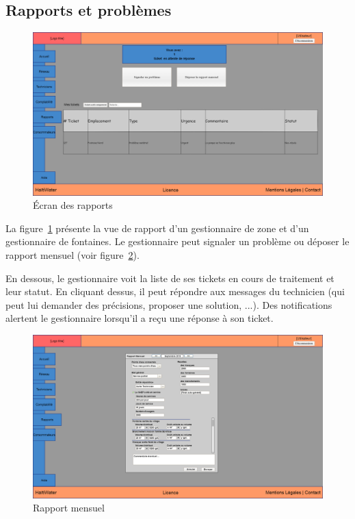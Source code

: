 \documentclass[a4paper, 11pt]{article}
\begin{document}
  \subsection{Rapports et problèmes}
    \begin{figure}[H]
        \includegraphics[width=\textwidth]{Cahier_des_Charges/rapports}
        \caption{\'Ecran des rapports}
        \label{fig:report}
    \end{figure}
    La figure~\ref{fig:report} présente la vue de rapport d'un gestionnaire de zone et d'un gestionnaire de fontaines. Le gestionnaire peut signaler un problème ou déposer le rapport mensuel (voir figure~\ref{fig:monthly_report}).

    En dessous, le gestionnaire voit la liste de ses tickets en cours de traitement et leur statut. En cliquant dessus, il peut répondre aux messages du technicien (qui peut lui demander des précisions, proposer une solution, ...). Des notifications alertent le gestionnaire lorsqu'il a reçu une réponse à son ticket.

    \begin{figure}[H]
        \includegraphics[width=\textwidth]{Cahier_des_Charges/rapports_mensuel}
        \caption{Rapport mensuel}
        \label{fig:monthly_report}
    \end{figure}
\end{document}

